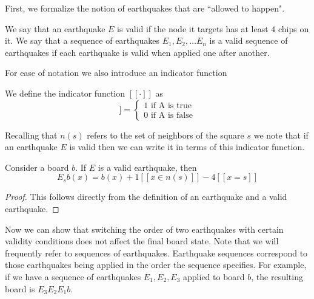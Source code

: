 \documentclass[runningheads,a4paper]{llncs}
\begin{document}
First, we formalize the notion of earthquakes that are ``allowed to happen".

\begin{definition}
We say that an earthquake $E$ is valid if the node it targets has at least $4$ chips on it. 
We say that a sequence of earthquakes $E_1, E_2, \ldots E_n$ is a valid sequence of earthquakes if each earthquake is valid when applied one after another. 
\end{definition}


For ease of notation we also introduce an indicator function
\begin{definition}
We define the indicator function $[[\cdot]]$ as 
\begin{equation*}
[[A]] = \begin{cases} 1 \text{ if A is true} \\ 0 \text{ if A is false} \end{cases}
\end{equation*}
\end{definition}

Recalling that $n(s)$ refers to the set of neighbors of the square $s$ we note that if an earthquake $E$ is valid then we can write it in terms of this indicator function.
\begin{lemma} 
\label{earthquakeredefine}
Consider a board $b$. If $E$ is a valid earthquake, then 
\begin{equation*}
E_s b(x) = b(x) + 1[[ x \in n(s)]] - 4[[x =s]]
\end{equation*}
\end{lemma}
\begin{proof}
This follows directly from the definition of an earthquake and a valid earthquake. 
\end{proof}

Now we can show that switching the order of two earthquakes with certain validity conditions does not affect the final board state. Note that we will frequently refer to sequences of earthquakes. Earthquake sequences correspond to those earthquakes being applied in the order the sequence specifies. For example, if we have a sequence of earthquakes $E_1,E_2,E_3$ applied to board $b$, the resulting board is $E_3E_2E_1b$.
\end{document}

